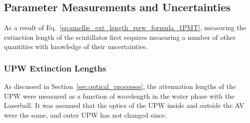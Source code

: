 
\subsection{Parameter Measurements and Uncertainties}\label{sec:smellie_ext_length_params_and_uncs}
As a result of Eq.~\ref{eq:smellie_ext_length_rsrw_formula_1PMT}, measuring the extinction length of the scintillator first requires measuring a number of other quantities with knowledge of their uncertainties.

\subsubsection{UPW Extinction Lengths}
As discussed in Section~\ref{sec:optical_processes}, the attenuation lengths of the UPW were measured as a function of wavelength in the water phase with the Laserball. It was assumed that the optics of the UPW inside and outside the AV were the same, and outer UPW has not changed since.

